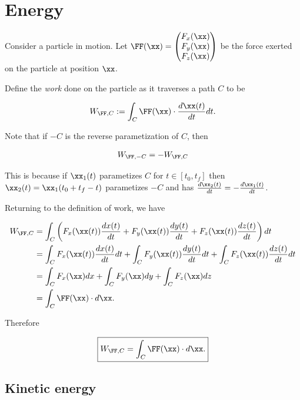\documentclass{article}
\begin{document}
\newpage

\section*{Energy}

Consider a particle in motion. Let $\FF(\xx) = \begin{pmatrix} F_x(\xx) \\ F_y(\xx) \\ F_z(\xx) \end{pmatrix}$ be the force exerted on the particle at position $\xx$.

Define the \textit{work} done on the particle as it traverses a path $C$ to be

\begin{align*}
    W_{\FF, C} := \int_C \FF(\xx) \cdot \frac{d \xx(t)}{d t} dt.
\end{align*}

Note that if $-C$ is the reverse parametization of $C$, then

\begin{align*}
    W_{\FF, -C} = -W_{\FF, C}
\end{align*}

This is because if $\xx_1(t)$ parametizes $C$ for $t \in [t_0, t_f]$ then $\xx_2(t) = \xx_1(t_0 + t_f - t)$ parametizes $-C$ and has $\frac{d\xx_2(t)}{dt} = - \frac{d\xx_1(t)}{dt}$.

Returning to the definition of work, we have

\begin{align*}
    W_{\FF, C} &= \int_C \left( F_x(\xx(t)) \frac{dx(t)}{dt} + F_y(\xx(t)) \frac{dy(t)}{d t} + F_z(\xx(t)) \frac{d z(t)}{dt} \right) dt \\
    &= \int_C F_x(\xx(t)) \frac{d x(t)}{d t} d t + \int_C F_y(\xx(t)) \frac{d y(t)}{d t} d t + \int_C F_z(\xx(t)) \frac{d z(t)}{d t} d t \\
    &= \int_C F_x(\xx) d x + \int_C F_y(\xx) d y + \int_C F_z(\xx) dz \\
    &= \int_C \FF(\xx) \cdot d \xx.
\end{align*}

Therefore 

\begin{align*}
    \boxed
    {
        W_{\FF, C} = \int_C \FF(\xx) \cdot d \xx.
    }
\end{align*}

\subsection*{Kinetic energy}
\end{document}
